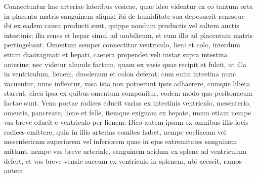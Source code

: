 Connectuntur hae arteriae lateribus vesicae, quae ideo videntur ex eo tantum orta
in placenta matris sanguinem aliquid ibi de humiditate sua deposuerit renesque ibi ex eadem causa producti sunt, quippe nondum productis vel saltem auctis intestinis; ilia renes et hepar simul ad umbilicum, et cum illo ad placentam matris pertingebant.
\pend%
\pstart%
Omentum semper connectitur ventriculo, lieni et colo, interdum etiam dia$\phi$ragmati et hepati, caetera propendet veli instar supra intestina anterius:
nec videtur aliunde factum, quam ex vasis quae recipit et fulcit, ut illa in ventriculum, lienem, duodenum et colon deferat;
cum enim intestina nunc vacuentur, nunc inflentur, vasa ista non potuerunt ipsis adhaerere, cumque libera starent, circa ipsa
ex quibus omentum componitur, eodem modo quo peritonaeum factae sunt.
\pend%
\pstart%
Vena portae radices educit varias ex intestinis ventriculo, mesenterio, omentis, pancreate, liene et felle, itemque exiguam ex hepate,
unum etiam nempe vas breve educit e ventriculo per lienem:
Dico autem ipsam ex omnibus illis locis radices emittere, quia in illis arterias comites habet, nempe coeliacam vel mesentericam superiorem vel inferiorem
\pend
\newpage
\pstart\noindent quae in ejus extremitates sanguinem mittant, nempe vas breve arteriale, sanguinem acidum ex splene ad ventriculum defert, et vas breve venale succum ex ventriculo in splenem, ubi acescit, ramos autem%
